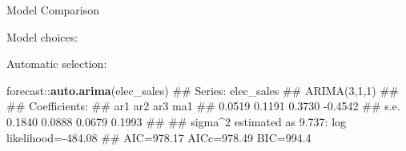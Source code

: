 \documentclass[11pt,ignorenonframetext,]{beamer}
\newenvironment{Shaded}{}{}
\newcommand{\DataTypeTok}[1]{\textcolor[rgb]{0.56,0.13,0.00}{#1}}
\newcommand{\DecValTok}[1]{\textcolor[rgb]{0.25,0.63,0.44}{#1}}
\newcommand{\KeywordTok}[1]{\textcolor[rgb]{0.00,0.44,0.13}{\textbf{#1}}}
\newcommand{\NormalTok}[1]{#1}
\newcommand{\OperatorTok}[1]{\textcolor[rgb]{0.40,0.40,0.40}{#1}}
\let\oldShaded\Shaded
\let\endoldShaded\endShaded
\renewenvironment{Shaded}{\footnotesize\begin{spacing}{0.9}\oldShaded}{\endoldShaded\end{spacing}}
\let\oldverbatim\verbatim
\let\endoldverbatim\endverbatim
\newcommand{\scriptoutput}{
  \renewenvironment{Shaded}{\scriptsize\begin{spacing}{0.9}\oldShaded}{\endoldShaded\end{spacing}}
  \renewenvironment{verbatim}{\scriptsize\begin{spacing}{0.9}\oldverbatim}{\endoldverbatim\end{spacing}}
}
\begin{document}
\begin{frame}[fragile]{%
\protect\hypertarget{model-comparison}{%
Model Comparison}}

\scriptoutput

Model choices:

\begin{Shaded}
\end{Shaded}

Automatic selection:

\begin{Shaded}
\begin{Highlighting}[]
\NormalTok{forecast}\OperatorTok{::}\KeywordTok{auto.arima}\NormalTok{(elec_sales)}
\NormalTok{## Series: elec_sales }
\NormalTok{## ARIMA(3,1,1) }
\NormalTok{## }
\NormalTok{## Coefficients:}
\NormalTok{##          ar1     ar2     ar3      ma1}
\NormalTok{##       0.0519  0.1191  0.3730  -0.4542}
\NormalTok{## s.e.  0.1840  0.0888  0.0679   0.1993}
\NormalTok{## }
\NormalTok{## sigma^2 estimated as 9.737:  log likelihood=-484.08}
\NormalTok{## AIC=978.17   AICc=978.49   BIC=994.4}
\end{Highlighting}
\end{Shaded}

\end{frame}
\end{document}

